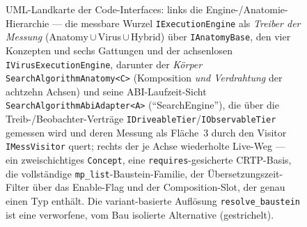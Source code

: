 \begin{nurlang}
\begin{figure}[htbp]
\caption{UML-Landkarte der Code-Interfaces: links die Engine-/Anatomie-Hierarchie --- die messbare Wurzel \texttt{IExecutionEngine} als \emph{Treiber der Messung} (Anatomy\,$\cup$\,Virus\,$\cup$\,Hybrid) über \texttt{IAnatomyBase}, den vier Konzepten und sechs Gattungen und der achsenlosen \texttt{IVirus\-Execution\-Engine}, darunter der \emph{Körper} \texttt{Search\-Algorithm\-Anatomy<C>} (Komposition \emph{und Verdrahtung} der achtzehn Achsen) und seine ABI-Laufzeit-Sicht \texttt{Search\-Algorithm\-Abi\-Adapter<A>} (\enquote{SearchEngine}), die über die Treib-/Beobachter-Verträge \texttt{IDriveableTier}/\texttt{IObservableTier} gemessen wird und deren Messung als Fläche~3 durch den Visitor \texttt{IMessVisitor} quert; rechts der je Achse wiederholte Live-Weg --- ein zweischichtiges \texttt{Concept}, eine \texttt{requires}-gesicherte CRTP-Basis, die vollständige \texttt{mp\_list}-Baustein-Familie, der Übersetzungszeit-Filter über das Enable-Flag und der Composition-Slot, der genau einen Typ enthält. Die variant-basierte Auflösung \texttt{resolve\_baustein} ist eine verworfene, vom Bau isolierte Alternative (gestrichelt).}\label{fig:uml-interfaces}
\end{figure}
\end{nurlang}

